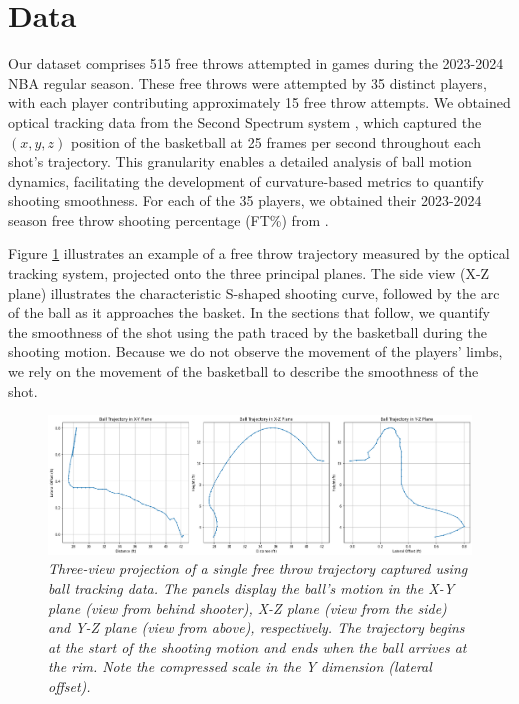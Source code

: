 \documentclass{article}
\begin{document}
  \section{Data}

    Our dataset comprises 515 free throws attempted in games during the 2023-2024 NBA regular season. These free throws were attempted by 35 distinct players, with each player contributing approximately 15 free throw attempts. We obtained optical tracking data from the Second Spectrum system \citep{national_basketball_association_nba_2016}, which captured the $(x, y, z)$ position of the basketball at 25 frames per second throughout each shot's trajectory. This granularity enables a detailed analysis of ball motion dynamics, facilitating the development of curvature-based metrics to quantify shooting smoothness. For each of the 35 players, we obtained their 2023-2024 season free throw shooting percentage (FT\%) from \citet{basketball_reference_2023-24_2024}.

    Figure \ref{fig:data-description} illustrates an example of a free throw trajectory measured by the optical tracking system, projected onto the three principal planes. The side view (X-Z plane) illustrates the characteristic S-shaped shooting curve, followed by the arc of the ball as it approaches the basket. In the sections that follow, we quantify the smoothness of the shot using the path traced by the basketball during the shooting motion. Because we do not observe the movement of the players' limbs, we rely on the movement of the basketball to describe the smoothness of the shot.

    \begin{figure}[H]
        \centering
        \includegraphics[scale=0.3]{reports/arxiv/data_description.png}
        \caption{\it Three-view projection of a single free throw trajectory captured using ball tracking data. The panels display the ball’s motion in the X-Y plane (view from behind shooter), X-Z plane (view from the side) and Y-Z plane (view from above), respectively. The trajectory begins at the start of the shooting motion and ends when the ball arrives at the rim. Note the compressed scale in the Y dimension (lateral offset).}
        \label{fig:data-description}
      \end{figure}
      
\end{document}
